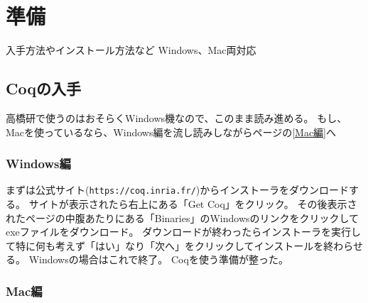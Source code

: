 \documentclass{jsbook}
\begin{document}
\chapter{準備}
入手方法やインストール方法など
Windows、Mac両対応
\newpage
\section{Coqの入手}
高橋研で使うのはおそらくWindows機なので、このまま読み進める。
もし、Macを使っているなら、Windows編を流し読みしながら\pageref{Mac編}ページの\ref{Mac編}へ
\subsection*{Windows編}
まずは公式サイト(\verb|https://coq.inria.fr/|)からインストーラをダウンロードする。
サイトが表示されたら右上にある「Get Coq」をクリック。
その後表示されたページの中腹あたりにある「Binaries」のWindowsのリンクをクリックしてexeファイルをダウンロード。
ダウンロードが終わったらインストーラを実行して特に何も考えず「はい」なり「次へ」をクリックしてインストールを終わらせる。
Windowsの場合はこれで終了。
Coqを使う準備が整った。
\subsection*{Mac編\label{Mac編}}
\end{document}
